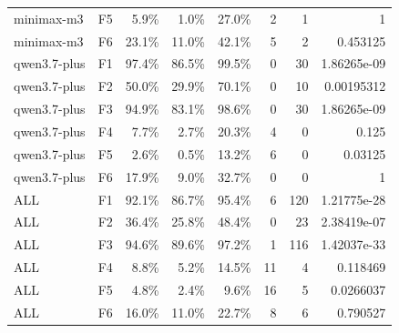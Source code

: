 \begin{tabular}{llrrrrrr}
minimax-m3 & F5 & 5.9\% & 1.0\% & 27.0\% & 2 & 1 & 1 \\
minimax-m3 & F6 & 23.1\% & 11.0\% & 42.1\% & 5 & 2 & 0.453125 \\
qwen3.7-plus & F1 & 97.4\% & 86.5\% & 99.5\% & 0 & 30 & 1.86265e-09 \\
qwen3.7-plus & F2 & 50.0\% & 29.9\% & 70.1\% & 0 & 10 & 0.00195312 \\
qwen3.7-plus & F3 & 94.9\% & 83.1\% & 98.6\% & 0 & 30 & 1.86265e-09 \\
qwen3.7-plus & F4 & 7.7\% & 2.7\% & 20.3\% & 4 & 0 & 0.125 \\
qwen3.7-plus & F5 & 2.6\% & 0.5\% & 13.2\% & 6 & 0 & 0.03125 \\
qwen3.7-plus & F6 & 17.9\% & 9.0\% & 32.7\% & 0 & 0 & 1 \\
ALL & F1 & 92.1\% & 86.7\% & 95.4\% & 6 & 120 & 1.21775e-28 \\
ALL & F2 & 36.4\% & 25.8\% & 48.4\% & 0 & 23 & 2.38419e-07 \\
ALL & F3 & 94.6\% & 89.6\% & 97.2\% & 1 & 116 & 1.42037e-33 \\
ALL & F4 & 8.8\% & 5.2\% & 14.5\% & 11 & 4 & 0.118469 \\
ALL & F5 & 4.8\% & 2.4\% & 9.6\% & 16 & 5 & 0.0266037 \\
ALL & F6 & 16.0\% & 11.0\% & 22.7\% & 8 & 6 & 0.790527 \\
\bottomrule
\end{tabular}

